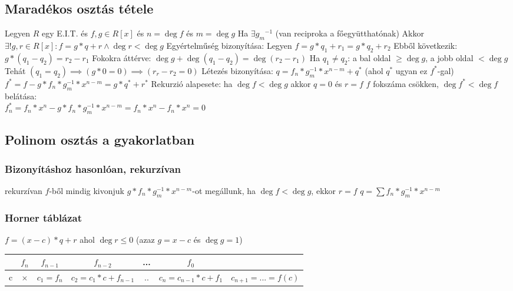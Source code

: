 \documentclass[12pt,a4paper]{article}
\begin{document}
\subsection{Maradékos osztás tétele}

\begin{outline}
	\1 Legyen $R$ egy E.I.T. és $f,g \in R[x]$ és $n=\deg f$ és $m = \deg g$
	\1 Ha $\exists {g_m}^{-1}$ (van reciproka a főegyütthatónak)
	\1 Akkor $\exists! g,r \in R[x]: f = g*q+r \wedge \deg r < \deg g$
	\1 Egyértelműség bizonyítása:
		\2 Legyen $f=g*q_1+r_1=g*q_2+r_2$
		\2 Ebből következik: $g*(q_1-q_2)=r_2-r_1$
		\2 Fokokra áttérve: $\deg g + \deg (q_1 - q_2) = \deg (r_2 - r_1)$
		\2 Ha $q_1 \ne q_2$: a bal oldal $\ge \deg g$, a jobb oldal $< \deg g$
		\2 Tehát $(q_1 = q_2) \implies (g*0=0) \implies (r_r - r_2 = 0)$
	\1 Létezés bizonyítása:
		\2 $q = f_n*g_m^{-1}*x^{n-m}+q^*$ \;\; (ahol $q^*$ ugyan ez $f^*$-gal)
		\2 $f^*=f-g*f_n*g_m^{-1}*x^{n-m} = g*q^*+r^*$
		\2 Rekurzió alapesete: ha $\deg f < \deg g$ akkor $q=0$ és $r=f$
		\2 $f$ fokszáma csökken, $\deg f^* < \deg f$ belátása:\\
		$f^*_n=f_n*x^n-g*f_n*g_m^{-1}*x^{n-m} = f_n*x^n-f_n*x^n = 0$
\end{outline}

\subsection{Polinom osztás a gyakorlatban}

\subsubsection{Bizonyításhoz hasonlóan, rekurzívan}

\begin{outline}
	\1 rekurzívan $f$-ből mindig kivonjuk $g*f_n*g_m^{-1}*x^{n-m}$-ot
	\1 megállunk, ha $\deg f < \deg g$, ekkor $r=f$
	\1 $q=\sum f_n*g_m^{-1}*x^{n-m}$
\end{outline}

\subsubsection{Horner táblázat}

\begin{outline}
	\1 $f = (x-c)*q + r$ ahol $\deg r \le 0$ \;\; (azaz $g=x-c$ és $\deg g = 1$)
\end{outline}

\begin{table}[h]
	\centering
	\begin{tabular}{|c|c|c|c|c|c|c|}
		\hline
		& $f_n$ & $f_{n-1}$ & $f_{n-2}$ & ... & $f_0$ & \\
		\hline
		c & $\times$ & $c_1=f_n$ & $c_2=c_1*c+f_{n-1}$ & .. & $c_n=c_{n-1}*c+f_1$ & $c_{n+1}=...=f(c)$ \\
		\hline
	\end{tabular}
\end{table}
\end{document}
